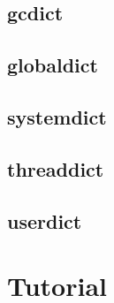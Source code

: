 \subsection{gcdict}
\subsection{globaldict}
\subsection{systemdict}
\subsection{threaddict}
\subsection{userdict}

\section{Tutorial}
